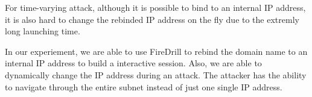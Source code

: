For time-varying attack, although it is possible to bind to an internal IP address, it is also hard to change the rebinded IP address on the fly due to the extremly long launching time. 

In our experiement, we are able to use FireDrill to rebind the domain name to an internal IP address to build a interactive session. Also, we are able to dynamically change the IP address during an attack. The attacker has the ability to navigate through the entire subnet instead of just one single IP address.
